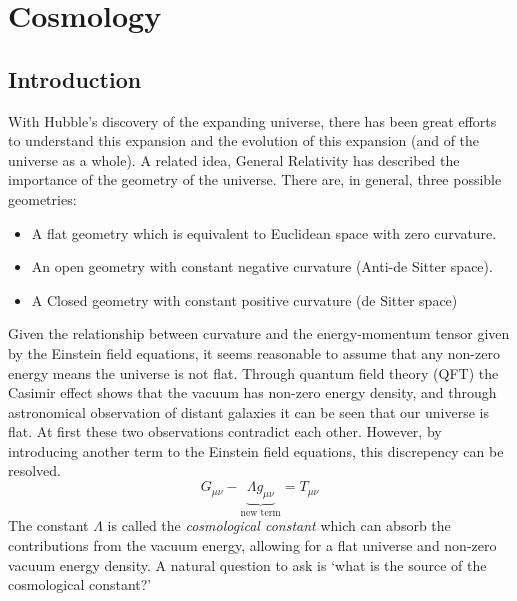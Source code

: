 \chapter{Cosmology}
\section{Introduction}
With Hubble's discovery of the expanding universe, there has been great efforts to understand this expansion and the evolution of this expansion (and of the universe as a whole).
A related idea, General Relativity has described the importance of the geometry of the universe.
There are, in general, three possible geometries:
\begin{itemize}
    \item A flat geometry which is equivalent to Euclidean space with zero curvature.
    \item An open geometry with constant negative curvature (Anti-de Sitter space).
    \item A Closed geometry with constant positive curvature (de Sitter space)
\end{itemize}
Given the relationship between curvature and the energy-momentum tensor given by the Einstein field equations, it seems reasonable to assume that any non-zero energy means the universe is not flat.
Through quantum field theory (QFT) the Casimir effect shows that the vacuum has non-zero energy density, and through astronomical observation of distant galaxies it can be seen that our universe is flat.
At first these two observations contradict each other. However, by introducing another term to the Einstein field equations, this discrepency can be resolved.
\[ G_{\mu\nu} - \underbrace{\Lambda g_{\mu\nu}}_{\text{new term}} = T_{\mu\nu} \]
The constant $\Lambda$ is called the \textit{cosmological constant} which can absorb the contributions from the vacuum energy, allowing for a flat universe and non-zero vacuum energy density.
A natural question to ask is `what is the source of the cosmological constant?'